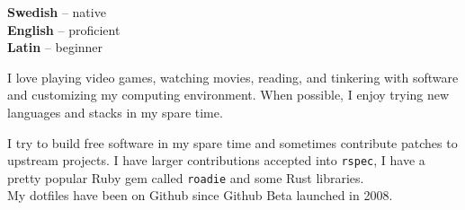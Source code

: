 \documentclass[9pt]{developercv} %
\begin{document}
\begin{minipage}[t]{0.3\textwidth}
  \vspace{-\baselineskip} %


  \textbf{Swedish} -- native\\
  \textbf{English} -- proficient\\
  \textbf{Latin} -- beginner
\end{minipage}
\hfill
\begin{minipage}[t]{0.3\textwidth}
  \vspace{-\baselineskip} %


  I love playing video games, watching movies, reading, and tinkering with
  software and customizing my computing environment. When possible, I enjoy
  trying new languages and stacks in my spare time.
\end{minipage}
\hfill
\begin{minipage}[t]{0.3\textwidth}
  \vspace{-\baselineskip} %


  I try to build free software in my spare time and sometimes contribute
  patches to upstream projects. I have larger contributions accepted into
  \texttt{rspec}, I have a pretty popular Ruby gem called \texttt{roadie} and
  some Rust libraries.\\
  My dotfiles have been on Github since Github Beta launched in 2008.
\end{minipage}


\end{document}
